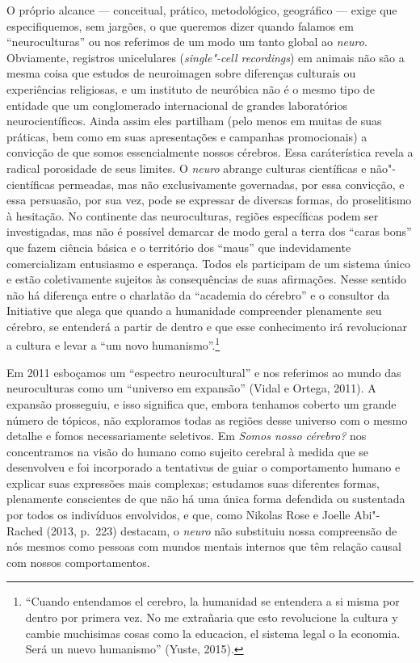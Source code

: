 O próprio alcance --- conceitual, prático, metodológico, geográfico ---
exige que especifiquemos, sem jargões, o que queremos dizer quando
falamos em ``neuroculturas'' ou nos referimos de um modo um tanto global
ao \emph{neuro}. Obviamente, registros unicelulares (\emph{single"-cell
recordings}) em animais não são a mesma coisa que estudos de neuroimagen
sobre diferenças culturais ou experiências religiosas, e um instituto de
neuróbica não é o mesmo tipo de entidade que um conglomerado
internacional de grandes laboratórios neurocientíficos. Ainda assim eles
partilham (pelo menos em muitas de suas práticas, bem como em suas
apresentações e campanhas promocionais) a convicção de que somos
essencialmente nossos cérebros. Essa caráterística revela a radical
porosidade de seus limites. O \emph{neuro} abrange culturas científicas
e não"-científicas permeadas, mas não exclusivamente governadas, por essa
convicção, e essa persuasão, por sua vez, pode se expressar de diversas
formas, do proselitismo à hesitação. No continente das neuroculturas,
regiões específicas podem ser investigadas, mas não é possível demarcar
de modo geral a terra dos ``caras bons'' que fazem ciência básica e o
território dos ``maus'' que indevidamente comercializam entusiasmo e
esperança. Todos els participam de um sistema único e estão
coletivamente sujeitos às consequências de suas afirmações. Nesse
sentido não há diferença entre o charlatão da ``academia do cérebro'' e
o consultor da  Initiative que alega que quando a humanidade
compreender plenamente seu cérebro, se entenderá a partir de dentro e
que esse conhecimento irá revolucionar a cultura e levar a ``um novo
humanismo''.\footnote[7]{``Cuando entendamos el cerebro, la humanidad se entendera a si misma
por dentro por primera vez. No me extrañaria que esto revolucione la
cultura y cambie muchisimas cosas como la educacion, el sistema legal o
la economia. Será un nuevo humanismo'' (Yuste, 2015).}

Em 2011 esboçamos um ``espectro neurocultural'' e nos referimos ao mundo
das neuroculturas como um ``universo em expansão'' (Vidal e Ortega,
2011). A expansão prosseguiu, e isso significa que, embora tenhamos
coberto um grande número de tópicos, não exploramos todas as regiões
desse universo com o mesmo detalhe e fomos necessariamente seletivos. Em
\emph{Somos nosso cérebro?} nos concentramos na visão do humano como
sujeito cerebral à medida que se desenvolveu e foi incorporado a
tentativas de guiar o comportamento humano e explicar suas expressões
mais complexas; estudamos suas diferentes formas, plenamente conscientes
de que não há uma única forma defendida ou sustentada por todos os
indivíduos envolvidos, e que, como Nikolas Rose e Joelle Abi"-Rached
(2013, p.~223) destacam, o \emph{neuro} não substituiu nossa compreensão
de nós mesmos como pessoas com mundos mentais internos que têm relação
causal com nossos comportamentos.

